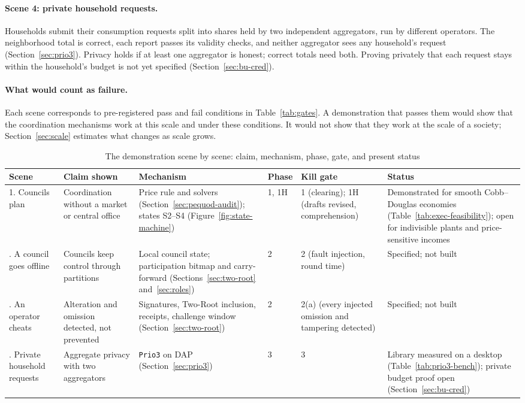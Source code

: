 \documentclass[10pt,twoside,openany]{book}
\theoremstyle{dpepstyle}
\begin{document}
\paragraph{Scene 4: private household requests.} Households submit their consumption requests split into shares held by two independent aggregators, run by different operators. The neighborhood total is correct, each report passes its validity checks, and neither aggregator sees any household's request (Section~\ref{sec:prio3}). Privacy holds if at least one aggregator is honest; correct totals need both. Proving privately that each request stays within the household's budget is not yet specified (Section~\ref{sec:bu-cred}).

\paragraph{What would count as failure.} Each scene corresponds to pre-registered pass and fail conditions in Table~\ref{tab:gates}. A demonstration that passes them would show that the coordination mechanisms work at this scale and under these conditions. It would not show that they work at the scale of a society; Section~\ref{sec:scale} estimates what changes as scale grows.

\begin{table}[htbp]
\centering
\caption{The demonstration scene by scene: claim, mechanism, phase, gate, and present status}
\label{tab:demo}
\scriptsize
\setlength{\tabcolsep}{3pt}
\begin{tabularx}{\textwidth}{L{0.62in} L{0.85in} Y L{0.32in} L{0.75in} L{1.05in}}
\toprule
\textbf{Scene} & \textbf{Claim shown} & \textbf{Mechanism} & \textbf{Phase} & \textbf{Kill gate} & \textbf{Status} \\
. Councils plan & Coordination without a market or central office & Price rule and solvers (Section~\ref{sec:pequod-audit}); states S2--S4 (Figure~\ref{fig:state-machine}) & 1, 1H & 1 (clearing); 1H (drafts revised, comprehension) & Demonstrated for smooth Cobb--Douglas economies (Table~\ref{tab:exec-feasibility}); open for indivisible plants and price-sensitive incomes \\
. A council goes offline & Councils keep control through partitions & Local council state; participation bitmap and carry-forward (Sections~\ref{sec:two-root} and~\ref{sec:roles}) & 2 & 2 (fault injection, round time) & Specified; not built \\
. An operator cheats & Alteration and omission detected, not prevented & Signatures, Two-Root inclusion, receipts, challenge window (Section~\ref{sec:two-root}) & 2 & 2(a) (every injected omission and tampering detected) & Specified; not built \\
. Private household requests & Aggregate privacy with two aggregators & \texttt{Prio3} on DAP (Section~\ref{sec:prio3}) & 3 & 3 & Library measured on a desktop (Table~\ref{tab:prio3-bench}); private budget proof open (Section~\ref{sec:bu-cred}) \\
\bottomrule
\end{tabularx}
\end{table}
\end{document}
